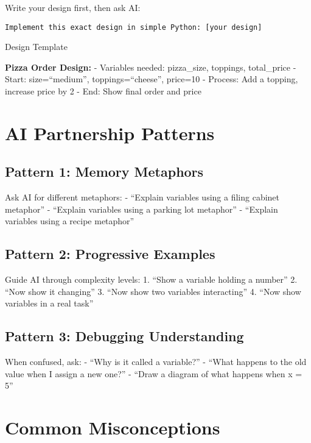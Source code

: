 \documentclass[
  letterpaper,
  DIV=11,
  numbers=noendperiod,
  oneside]{scrreprt}
\begin{document}
Write your design first, then ask AI:

\begin{verbatim}
Implement this exact design in simple Python: [your design]
\end{verbatim}

Design Template

\textbf{Pizza Order Design:} - Variables needed: pizza\_size, toppings,
total\_price - Start: size=``medium'', toppings=``cheese'', price=10 -
Process: Add a topping, increase price by 2 - End: Show final order and
price

\section{AI Partnership Patterns}\label{ai-partnership-patterns-1}

\subsection{Pattern 1: Memory
Metaphors}\label{pattern-1-memory-metaphors}

Ask AI for different metaphors: - ``Explain variables using a filing
cabinet metaphor'' - ``Explain variables using a parking lot metaphor''
- ``Explain variables using a recipe metaphor''

\subsection{Pattern 2: Progressive
Examples}\label{pattern-2-progressive-examples}

Guide AI through complexity levels: 1. ``Show a variable holding a
number'' 2. ``Now show it changing'' 3. ``Now show two variables
interacting'' 4. ``Now show variables in a real task''

\subsection{Pattern 3: Debugging
Understanding}\label{pattern-3-debugging-understanding}

When confused, ask: - ``Why is it called a variable?'' - ``What happens
to the old value when I assign a new one?'' - ``Draw a diagram of what
happens when x = 5''

\section{Common Misconceptions}\label{common-misconceptions-1}
\end{document}
